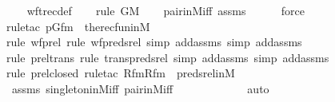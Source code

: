 \begin{isabellebody}
\ \ \isamarkupfalse%
\ wftrec{\isacharunderscore}{\kern0pt}def\isanewline
\ \ \ \isamarkupfalse%
{\isacharparenleft}{\kern0pt}rule\ GM{\isacharparenright}{\kern0pt}\isanewline
\ \ \isamarkupfalse%
\ pair{\isacharunderscore}{\kern0pt}in{\isacharunderscore}{\kern0pt}M{\isacharunderscore}{\kern0pt}iff\ assms\isanewline
\ \ \ \ \isamarkupfalse%
\ force\isanewline
\ \ \ \isamarkupfalse%
{\isacharparenleft}{\kern0pt}rule{\isacharunderscore}{\kern0pt}tac\ p{\isacharequal}{\kern0pt}Gfm\ \ the{\isacharunderscore}{\kern0pt}recfun{\isacharunderscore}{\kern0pt}in{\isacharunderscore}{\kern0pt}M{\isacharparenright}{\kern0pt}\isanewline
\ \ \ \ \ \ \ \ \ \ \isamarkupfalse%
{\isacharparenleft}{\kern0pt}rule\ wf{\isacharunderscore}{\kern0pt}prel{\isacharcomma}{\kern0pt}\ rule\ wf{\isacharunderscore}{\kern0pt}preds{\isacharunderscore}{\kern0pt}rel{\isacharcomma}{\kern0pt}\ simp\ add{\isacharcolon}{\kern0pt}assms{\isacharcomma}{\kern0pt}\ simp\ add{\isacharcolon}{\kern0pt}assms{\isacharparenright}{\kern0pt}\isanewline
\ \ \ \ \ \ \ \ \ \isamarkupfalse%
{\isacharparenleft}{\kern0pt}rule\ prel{\isacharunderscore}{\kern0pt}trans{\isacharcomma}{\kern0pt}\ rule\ trans{\isacharunderscore}{\kern0pt}preds{\isacharunderscore}{\kern0pt}rel{\isacharcomma}{\kern0pt}\ simp\ add{\isacharcolon}{\kern0pt}assms{\isacharcomma}{\kern0pt}\ simp\ add{\isacharcolon}{\kern0pt}assms{\isacharparenright}{\kern0pt}\isanewline
\ \ \ \ \ \ \ \ \isamarkupfalse%
{\isacharparenleft}{\kern0pt}rule\ prel{\isacharunderscore}{\kern0pt}closed{\isacharcomma}{\kern0pt}\ rule{\isacharunderscore}{\kern0pt}tac\ Rfm{\isacharequal}{\kern0pt}Rfm\ \ preds{\isacharunderscore}{\kern0pt}rel{\isacharunderscore}{\kern0pt}in{\isacharunderscore}{\kern0pt}M{\isacharparenright}{\kern0pt}\isanewline
\ \ \isamarkupfalse%
\ assms\ singleton{\isacharunderscore}{\kern0pt}in{\isacharunderscore}{\kern0pt}M{\isacharunderscore}{\kern0pt}iff\ pair{\isacharunderscore}{\kern0pt}in{\isacharunderscore}{\kern0pt}M{\isacharunderscore}{\kern0pt}iff\isanewline
\ \ \ \ \ \ \ \ \ \ \ \isamarkupfalse%
\ auto{\isacharbrackleft}{\kern0pt}{}{\isacharbrackright}{\kern0pt}\isanewline
\ \ \isamarkupfalse%

\end{isabellebody}
